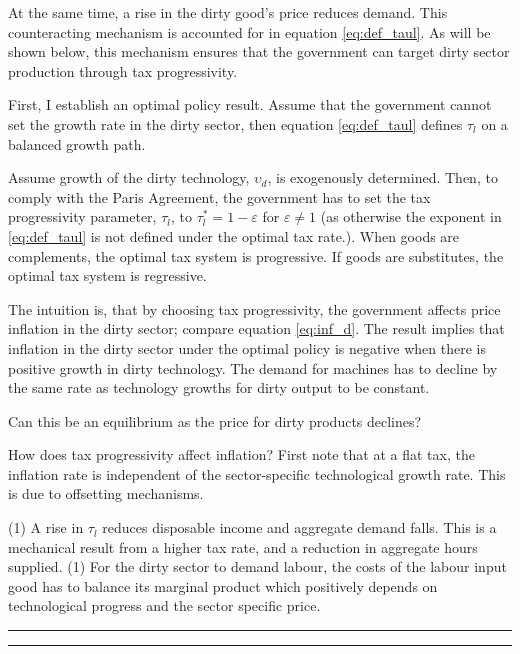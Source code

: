 At the same time, a rise in the dirty good's price reduces demand. This counteracting mechanism is accounted for in equation \ref{eq:def_taul}. 
As will be shown below, this mechanism ensures that the government can target dirty sector production through tax progressivity. 

First, I establish an optimal policy result. Assume that the government cannot set the growth rate in the dirty sector, then equation \ref{eq:def_taul} defines $\tau_l$ on a balanced growth path.

\begin{prop}
	Assume growth of the dirty technology, $\upsilon_{d}$, is exogenously determined. 
	Then, to comply with the Paris Agreement, the government has to set the tax progressivity parameter, $\tau_l$, to $\tau^*_l=1-\varepsilon$ for $\varepsilon\neq 1$ (as otherwise the exponent in \ref{eq:def_taul} is not defined under the optimal tax rate.).
	When goods are complements, the optimal tax system is progressive. If goods are substitutes, the optimal tax system is regressive.
\end{prop}

The intuition is, that by choosing tax progressivity, the government affects price inflation in the dirty sector; compare equation \ref{eq:inf_d}. 
The result implies that inflation in the dirty sector under the optimal policy is negative when there is positive growth in dirty technology. The demand for machines has to decline by the same rate as technology growths for dirty output to be constant.  

Can this be an equilibrium as the price for dirty products declines?

How does tax progressivity affect inflation? 
First note that at a flat tax, the inflation rate is independent of the sector-specific technological growth rate. This is due to offsetting mechanisms.


(1) A rise in $\tau_l$ reduces disposable income and aggregate demand falls. This is a mechanical result from a higher tax rate, and a reduction in aggregate hours supplied.  
(1) For the dirty sector to demand labour, the costs of the labour input good has to balance its marginal product which positively depends on technological progress and the sector specific price. 

\noindent\rule[1ex]{\textwidth}{1pt} 


\noindent\rule[1ex]{\textwidth}{1pt}

